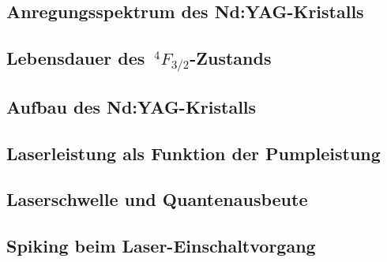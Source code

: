 \documentclass[../main.tex]{subfiles}
\begin{document}
    \subsection{Anregungsspektrum des Nd:YAG-Kristalls}

    \subsection{Lebensdauer des $\,^4F_{3/2}$-Zustands}

    \subsection{Aufbau des Nd:YAG-Kristalls}

    \subsection{Laserleistung als Funktion der Pumpleistung}

    \subsection{Laserschwelle und Quantenausbeute}

    \subsection{Spiking beim Laser-Einschaltvorgang}
\end{document}
